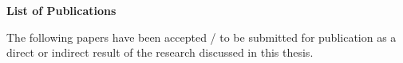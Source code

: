 \documentclass[oneside, a4paper, 11pt, ]{report}
\begin{document}
\clearpage


\pagestyle{empty} %

\null\vfill %


\begin{flushright}
\end{flushright}

\vfill\vfill\vfill\vfill\vfill\vfill\null %

\clearpage %


\begin{abstract}


\end{abstract} 

\clearpage


\clearpage %


\pagestyle{empty}


\newpage

\begin{Publications}
\begin{center}
 \begin{large}
\textbf{List of Publications}
\end{large}
\end{center}

\noindent The following papers have been accepted / to be submitted for publication as a direct or indirect result of the research discussed in this thesis.\\

\null\vfill
\end{Publications}
\end{document}
